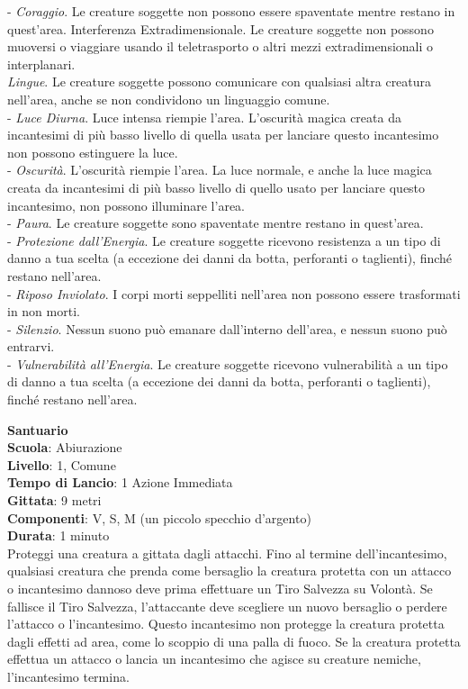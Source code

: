 \begin{multicols}{2}
- \textit{Coraggio}. Le creature soggette non possono essere spaventate mentre restano in quest'area. Interferenza Extradimensionale. Le creature soggette non possono muoversi o viaggiare usando il teletrasporto o altri mezzi extradimensionali o interplanari.\\
\textit{Lingue}. Le creature soggette possono comunicare con qualsiasi altra creatura nell'area, anche se non condividono un linguaggio comune.\\
- \textit{Luce Diurna}. Luce intensa riempie l'area. L'oscurità magica creata da incantesimi di più basso livello di quella usata per lanciare questo incantesimo non possono estinguere la luce.\\
- \textit{Oscurità}. L'oscurità riempie l'area. La luce normale, e anche la luce magica creata da incantesimi di più basso livello di quello usato per lanciare questo incantesimo, non possono illuminare l'area.\\
- \textit{Paura}. Le creature soggette sono spaventate mentre restano in quest'area.\\
- \textit{Protezione dall'Energia}. Le creature soggette ricevono resistenza a un tipo di danno a tua scelta (a eccezione dei danni da botta, perforanti o taglienti), finché restano nell'area.\\
- \textit{Riposo Inviolato}. I corpi morti seppelliti nell'area non possono essere trasformati in non morti.\\
- \textit{Silenzio}. Nessun suono può emanare dall'interno dell'area, e nessun suono può entrarvi.\\
- \textit{Vulnerabilità all'Energia}. Le creature soggette ricevono vulnerabilità a un tipo di danno a tua scelta (a eccezione dei danni da botta, perforanti o taglienti), finché restano nell'area.

\medskip\textbf{Santuario}\\
\textbf{Scuola}: Abiurazione\\
\textbf{Livello}: 1, Comune\\
\textbf{Tempo di Lancio}: 1 Azione Immediata\\
\textbf{Gittata}: 9 metri\\
\textbf{Componenti}: V, S, M (un piccolo specchio d'argento)\\
\textbf{Durata}: 1 minuto\\
Proteggi una creatura a gittata dagli attacchi. Fino al termine dell'incantesimo, qualsiasi creatura che prenda come bersaglio la creatura protetta con un attacco o incantesimo dannoso deve prima effettuare un Tiro Salvezza su Volontà. Se fallisce il Tiro Salvezza, l'attaccante deve scegliere un nuovo bersaglio o perdere l'attacco o l'incantesimo. Questo incantesimo non protegge la creatura protetta dagli effetti ad area, come lo scoppio di una palla di fuoco. Se la creatura protetta effettua un attacco o lancia un incantesimo che agisce su creature nemiche, l'incantesimo termina.


\end{multicols}
